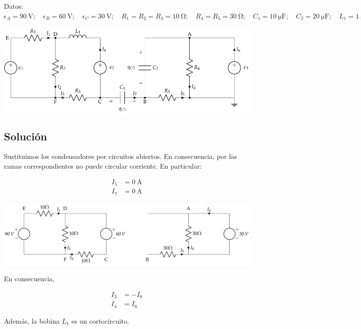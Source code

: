 Datos:
$\epsilon_{A}=\qty{90}{\volt};\quad \epsilon_{B}=\qty{60}{\volt};\quad
\epsilon_{C}=\qty{30}{\volt};\quad R_{1}= R_2 = R_3 =
\qty{10}{\ohm};\quad R_{4}= R_5 = \qty{30}{\ohm};\quad C_{1}=
\qty{10}{\micro\farad};\quad C_{2}= \qty{20}{\micro\farad};\quad L_1 =
\qty{1}{\micro\henry}$

\begin{center}
  \includegraphics[scale = 0.8]{figuras/mallas_carga_inicial.pdf}
\end{center}


\subsection*{Solución}

Sustituimos los condensadores por circuitos abiertos. En consecuencia, por las ramas correspondientes no puede circular corriente. En particular:

\begin{align*}
  I_5 &= \qty{0}{\ampere}\\
  I_7 &= \qty{0}{\ampere}
\end{align*}

\begin{center}
  \includegraphics[width=\linewidth]{figuras/BT1_10_mod.pdf}
\end{center}

En consecuencia,

\begin{align*}
  I_3 &= -I_8\\
  I_4 &= I_6
\end{align*}

Además, la bobina $L_1$ es un cortocircuito.

